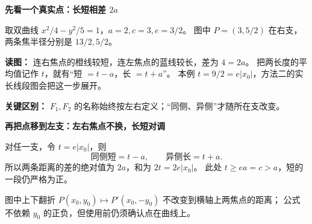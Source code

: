 \clearpage
\begin{explanationbox}
\textbf{\textcolor{CExplanation}{先看一个真实点：长短相差 $2a$}}

取双曲线 $x^2/4-y^2/5=1$，$a=2,c=3,e=3/2$。
图中 $P=(3,5/2)$ 在右支，两条焦半径分别是 $13/2,5/2$。

\textbf{读图：} 连右焦点的橙线较短，连左焦点的蓝线较长，差为 $4=2a$。
把两长度的平均值记作 $t$，就有“短 $=t-a$，长 $=t+a$”。
本例 $t=9/2=e|x_0|$，方法二的实长线段图会把这一步展开。

\textbf{关键区别：} $F_1,F_2$ 的名称始终按左右定义；“同侧、异侧”才随所在支改变。
\end{explanationbox}
\clearpage
\begin{explanationbox}
\textbf{\textcolor{CExplanation}{再把点移到左支：左右焦点不换，长短对调}}

对任一支，令 $t=e|x_0|$，则
\[
\boxed{\text{同侧短}=t-a},\qquad\boxed{\text{异侧长}=t+a}.
\]
所以两条距离的差的绝对值为 $2a$，和为 $2t=2e|x_0|$。
此处 $t\ge ea=c>a$，短的一段仍严格为正。

图中上下翻折 $P(x_0,y_0)\mapsto P'(x_0,-y_0)$ 不改变到横轴上两焦点的距离；
公式不依赖 $y_0$ 的正负，但使用前仍须确认点在曲线上。
\end{explanationbox}
